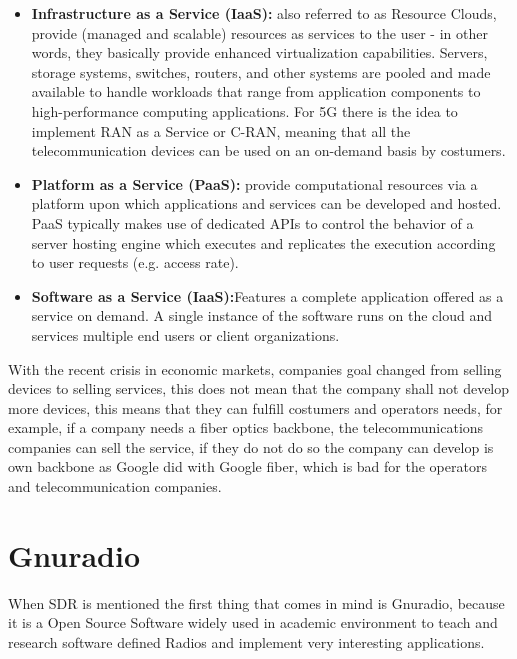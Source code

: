 \begin{itemize}
    \item \textbf{Infrastructure as a Service (IaaS):} also referred to as
    Resource Clouds, provide (managed and scalable) resources as services to
    the user - in other words, they basically provide enhanced virtualization
    capabilities. Servers, storage systems, switches, routers, and other systems
    are pooled and made available to handle workloads that range from application
    components to high-performance computing applications. For 5G there is the
    idea to implement RAN as a Service or C-RAN, meaning that all the
    telecommunication devices can be used on an on-demand basis by costumers.

    \item \textbf{Platform as a Service (PaaS):} provide computational resources
    via a platform upon which applications and services can be developed and hosted.
    PaaS typically makes use of dedicated APIs to control the behavior of a server
    hosting engine which executes and replicates the execution according to user
    requests (e.g. access rate).

    \item \textbf{Software as a Service (IaaS):}Features a complete application
    offered as a service on demand. A single instance of the software runs on the
    cloud and services multiple end users or client organizations.
\end{itemize}

With the recent crisis in economic markets, companies goal changed from selling
devices to selling services, this does not mean that the company shall not
develop more devices, this means that they can fulfill costumers and operators
needs, for example, if a company needs a fiber optics backbone, the
telecommunications companies can sell the service, if they do not do so the
company can develop is own backbone as Google did with Google fiber, which is
bad for the operators and telecommunication companies.\\

\section{Gnuradio}
\label{sdr:gnuradio}

When SDR is mentioned the first thing that comes in mind is Gnuradio, because it
is a Open Source Software widely used in academic environment to teach and
research software defined Radios and implement very interesting applications.

